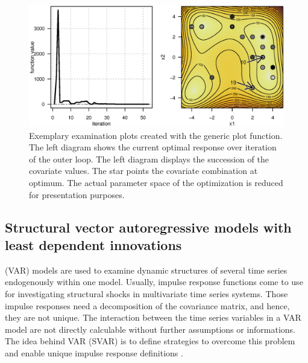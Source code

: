 \begin{figure}[htbp]
\centering
\includegraphics[width=1.025\textwidth]{Fig/fig2-ex2-plot.eps}
\caption{Exemplary examination plots created with the generic plot function. The left diagram shows the current optimal response over iteration of the outer loop. The left diagram displays the succession of the covariate values. The star points the covariate combination at optimum. The actual parameter space of the optimization is reduced for presentation purposes.}
\label{fig:fig2}
\end{figure}

\subsection{Structural vector autoregressive models with least dependent innovations}
 (VAR) models are used to examine dynamic structures of several time series endogenously within one model. Usually, impulse response functions come to use for investigating structural shocks in multivariate time series systems. Those impulse responses need a decomposition of the covariance matrix, and hence, they are not unique. The interaction between the time series variables in a VAR model are not directly calculable without further assumptions or informations. The idea behind  VAR (SVAR) is to define strategies to overcome this problem and enable unique impulse response definitions \citep{lutkepohl_2006}.

